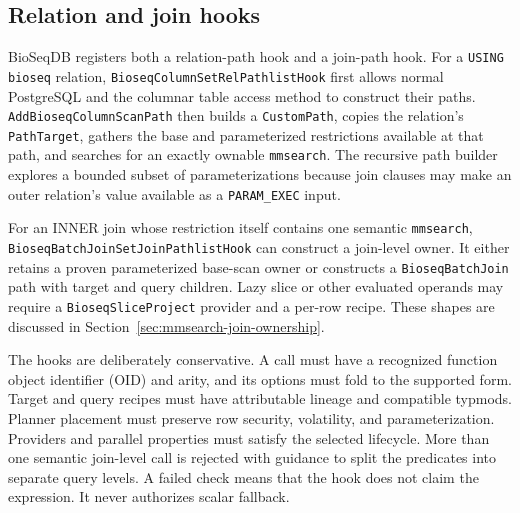 \begin{center}
\begin{minipage}{\linewidth}
\label{fig:mmsearch-planner-ownership}
\end{minipage}
\end{center}

\subsection{Relation and join hooks}

BioSeqDB registers both a relation-path hook and a join-path hook.  For a
\texttt{USING bioseq} relation, \texttt{BioseqColumnSetRelPathlistHook}
first allows normal PostgreSQL and the columnar table access method to
construct their paths.  \texttt{AddBioseqColumnScanPath} then builds a
\texttt{CustomPath}, copies the relation's \texttt{PathTarget}, gathers the
base and parameterized restrictions available at that path, and searches for
an exactly ownable \texttt{mmsearch}.  The recursive path builder explores a
bounded subset of parameterizations because join clauses may make an outer
relation's value available as a \texttt{PARAM\_EXEC} input.

For an INNER join whose restriction itself contains one semantic
\texttt{mmsearch},
\texttt{BioseqBatchJoinSet}\allowbreak\texttt{JoinPathlistHook} can construct a
join-level owner.  It either retains a proven parameterized base-scan owner or
constructs a \texttt{BioseqBatchJoin} path with target and query children.
Lazy slice or other evaluated operands may require a
\texttt{BioseqSliceProject} provider and a per-row recipe.  These shapes are
discussed in Section~\ref{sec:mmsearch-join-ownership}.

The hooks are deliberately conservative.  A call must have a recognized
function object identifier (OID) and arity, and its options must fold to the
supported form.  Target and query recipes must have attributable lineage and
compatible typmods.  Planner placement must preserve row security, volatility,
and parameterization.  Providers and parallel properties must satisfy the
selected lifecycle.  More than one semantic join-level call is rejected with
guidance to split the predicates into separate query levels.  A failed check
means that the hook does not claim the expression.  It never authorizes scalar
fallback.

